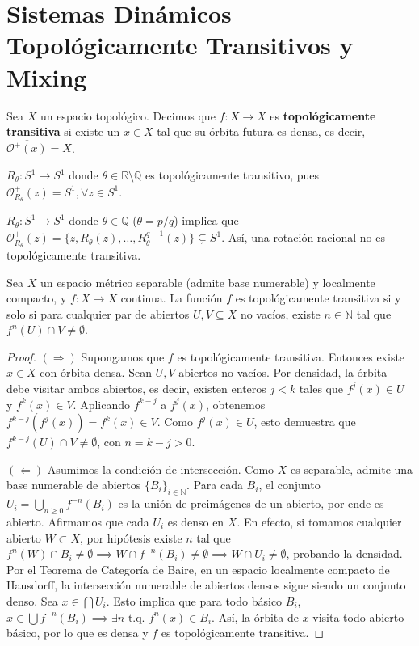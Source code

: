\section{Sistemas Dinámicos Topológicamente Transitivos y Mixing}

\begin{definicion}
	Sea $X$ un espacio topológico. Decimos que $f: X \to X$ es \textbf{topológicamente transitiva} si existe un $x \in X$ tal que su órbita futura es densa, es decir, $\overline{\mathcal{O}^+(x)} = X$.
\end{definicion}

\begin{ejemplo}
	$R_\theta: S^1 \to S^1$ donde $\theta \in \mathbb{R} \setminus \mathbb{Q}$ es topológicamente transitivo, pues $\overline{\mathcal{O}_{R_\theta}^+(z)} = S^1, \forall z \in S^1$.
\end{ejemplo}

\begin{ejemplo}
	$R_\theta: S^1 \to S^1$ donde $\theta \in \mathbb{Q}$ ($\theta = p/q$) implica que $\overline{\mathcal{O}_{R_\theta}^+(z)} = \{z, R_\theta(z), \dots, R_\theta^{q-1}(z)\} \subsetneq S^1$. Así, una rotación racional no es topológicamente transitiva.
\end{ejemplo}

\begin{teorema}
	Sea $X$ un espacio métrico separable (admite base numerable) y localmente compacto, y $f: X \to X$ continua. La función $f$ es topológicamente transitiva si y solo si para cualquier par de abiertos $U, V \subseteq X$ no vacíos, existe $n \in \mathbb{N}$ tal que $f^n(U) \cap V \neq \emptyset$.
\end{teorema}
\begin{proof}
	$(\Rightarrow)$ Supongamos que $f$ es topológicamente transitiva. Entonces existe $x \in X$ con órbita densa. Sean $U, V$ abiertos no vacíos. Por densidad, la órbita debe visitar ambos abiertos, es decir, existen enteros $j < k$ tales que $f^j(x) \in U$ y $f^k(x) \in V$.
	Aplicando $f^{k-j}$ a $f^j(x)$, obtenemos $f^{k-j}(f^j(x)) = f^k(x) \in V$. Como $f^j(x) \in U$, esto demuestra que $f^{k-j}(U) \cap V \neq \emptyset$, con $n = k-j > 0$.
	
	$(\Leftarrow)$ Asumimos la condición de intersección. Como $X$ es separable, admite una base numerable de abiertos $\{B_i\}_{i \in \mathbb{N}}$. Para cada $B_i$, el conjunto $U_i = \bigcup_{n \ge 0} f^{-n}(B_i)$ es la unión de preimágenes de un abierto, por ende es abierto. Afirmamos que cada $U_i$ es denso en $X$. En efecto, si tomamos cualquier abierto $W \subset X$, por hipótesis existe $n$ tal que $f^n(W) \cap B_i \neq \emptyset \implies W \cap f^{-n}(B_i) \neq \emptyset \implies W \cap U_i \neq \emptyset$, probando la densidad.
	Por el Teorema de Categoría de Baire, en un espacio localmente compacto de Hausdorff, la intersección numerable de abiertos densos sigue siendo un conjunto denso. Sea $x \in \bigcap U_i$. Esto implica que para todo básico $B_i$, $x \in \bigcup f^{-n}(B_i) \implies \exists n \text{ t.q. } f^n(x) \in B_i$. Así, la órbita de $x$ visita todo abierto básico, por lo que es densa y $f$ es topológicamente transitiva.
\end{proof}

